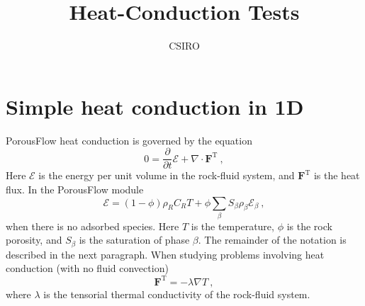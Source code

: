 \documentclass[]{scrreprt}
\def\phase{\beta}
\def\flux{\mathbf{F}}
\def\energydens{\mathcal{E}}
\begin{document}
\title{Heat-Conduction Tests}
\author{CSIRO}
\maketitle

\tableofcontents

\chapter{Simple heat conduction in 1D}

PorousFlow heat conduction is governed by the equation
\begin{equation}
0 = \frac{\partial}{\partial t}\energydens + \nabla\cdot \flux^{\mathrm{T}} \ ,
\label{eqn.heat.cond}
\end{equation}
Here $\energydens$ is the energy per unit volume in the rock-fluid
system, and $\flux^{\mathrm{T}}$ is the heat flux.  In the
PorousFlow module
\begin{equation}
\energydens = (1 - \phi)\rho_{R}C_{R} T + \phi
\sum_{\phase}S_{\phase}\rho_{\phase}\energydens_{\phase} \ ,
\end{equation}
when there is no adsorbed species.  Here $T$ is the temperature,
$\phi$ is the rock porosity, and $S_{\phase}$ is the saturation of
phase $\phase$.  The remainder of the notation is described in the
next paragraph.  When studying problems involving heat conduction
(with no fluid convection)
\begin{equation}
\flux^{\mathrm{T}} = -\lambda\nabla T \ ,
\end{equation}
where $\lambda$ is the tensorial thermal conductivity of the
rock-fluid system.
\end{document}
